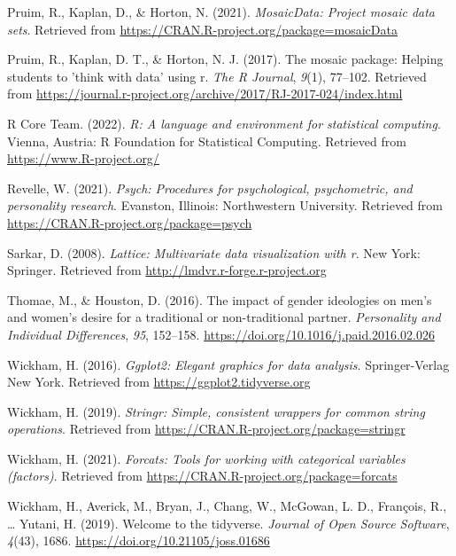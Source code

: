 \documentclass[
  english,
  man]{apa6}
\begin{document}
\leavevmode\hypertarget{ref-R-mosaicData}{}%
Pruim, R., Kaplan, D., \& Horton, N. (2021). \emph{MosaicData: Project mosaic data sets}. Retrieved from \url{https://CRAN.R-project.org/package=mosaicData}

\leavevmode\hypertarget{ref-R-mosaic}{}%
Pruim, R., Kaplan, D. T., \& Horton, N. J. (2017). The mosaic package: Helping students to 'think with data' using r. \emph{The R Journal}, \emph{9}(1), 77--102. Retrieved from \url{https://journal.r-project.org/archive/2017/RJ-2017-024/index.html}

\leavevmode\hypertarget{ref-R-base}{}%
R Core Team. (2022). \emph{R: A language and environment for statistical computing}. Vienna, Austria: R Foundation for Statistical Computing. Retrieved from \url{https://www.R-project.org/}

\leavevmode\hypertarget{ref-R-psych}{}%
Revelle, W. (2021). \emph{Psych: Procedures for psychological, psychometric, and personality research}. Evanston, Illinois: Northwestern University. Retrieved from \url{https://CRAN.R-project.org/package=psych}

\leavevmode\hypertarget{ref-R-lattice}{}%
Sarkar, D. (2008). \emph{Lattice: Multivariate data visualization with r}. New York: Springer. Retrieved from \url{http://lmdvr.r-forge.r-project.org}

\leavevmode\hypertarget{ref-Thomae}{}%
Thomae, M., \& Houston, D. (2016). The impact of gender ideologies on men's and women's desire for a traditional or non-traditional partner. \emph{Personality and Individual Differences}, \emph{95}, 152--158. \url{https://doi.org/10.1016/j.paid.2016.02.026}

\leavevmode\hypertarget{ref-R-ggplot2}{}%
Wickham, H. (2016). \emph{Ggplot2: Elegant graphics for data analysis}. Springer-Verlag New York. Retrieved from \url{https://ggplot2.tidyverse.org}

\leavevmode\hypertarget{ref-R-stringr}{}%
Wickham, H. (2019). \emph{Stringr: Simple, consistent wrappers for common string operations}. Retrieved from \url{https://CRAN.R-project.org/package=stringr}

\leavevmode\hypertarget{ref-R-forcats}{}%
Wickham, H. (2021). \emph{Forcats: Tools for working with categorical variables (factors)}. Retrieved from \url{https://CRAN.R-project.org/package=forcats}

\leavevmode\hypertarget{ref-R-tidyverse}{}%
Wickham, H., Averick, M., Bryan, J., Chang, W., McGowan, L. D., François, R., \ldots{} Yutani, H. (2019). Welcome to the tidyverse. \emph{Journal of Open Source Software}, \emph{4}(43), 1686. \url{https://doi.org/10.21105/joss.01686}
\end{document}
